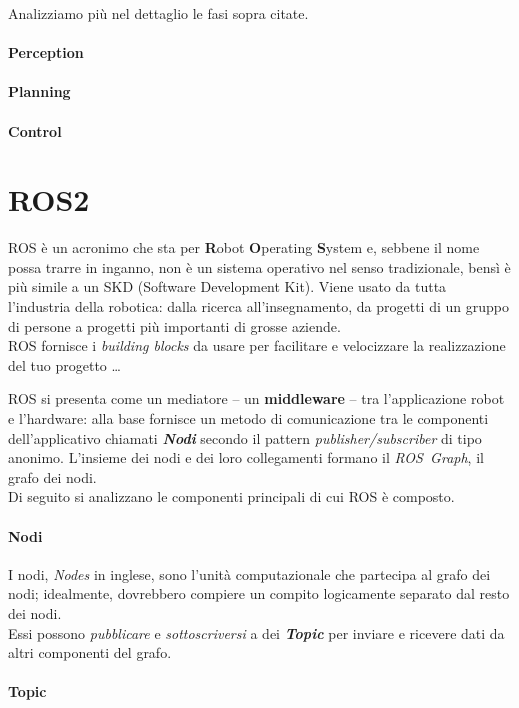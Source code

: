 Analizziamo più nel dettaglio le fasi sopra citate. %
\paragraph{Perception}

\paragraph{Planning}

\paragraph{Control}

\section{ROS2}
ROS è un acronimo che sta per \textbf{R}obot \textbf{O}perating \textbf{S}ystem e,
sebbene il nome possa trarre in inganno, non è un sistema operativo nel senso tradizionale,
bensì è più simile a un SKD (Software Development Kit).
Viene usato da tutta l'industria della robotica: dalla ricerca all'insegnamento, da progetti
di un gruppo di persone a progetti più importanti di grosse aziende.\\
ROS fornisce i \textit{building blocks} da usare per facilitare e velocizzare la realizzazione
del tuo progetto \dots

ROS si presenta come un mediatore -- un \textbf{middleware} -- tra l'applicazione robot e l'hardware:
alla base fornisce un metodo di comunicazione tra le componenti dell'applicativo chiamati
\textbf{\textit{Nodi}} secondo il pattern \textit{publisher/subscriber} di tipo anonimo.
L'insieme dei nodi e dei loro collegamenti formano il \textit{ROS~Graph}, il grafo dei nodi.
\\

\noindent Di seguito si analizzano le componenti principali di cui ROS è composto.

\paragraph{Nodi}
I nodi, \textit{Nodes} in inglese, sono l'unità computazionale che partecipa al grafo dei nodi;
idealmente, dovrebbero compiere un compito logicamente separato dal resto dei nodi.\\
Essi possono \textit{pubblicare} e \textit{sottoscriversi} a dei \textbf{\textit{Topic}} per inviare e
ricevere dati da altri componenti del grafo.

\paragraph{Topic}
